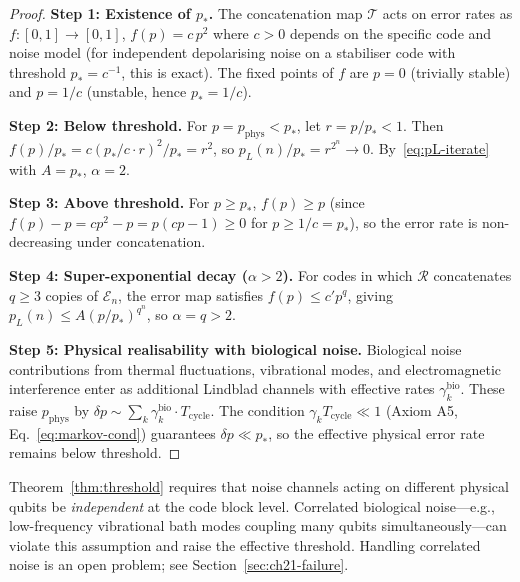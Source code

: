 \begin{proof}
\textbf{Step 1: Existence of $p_*$.}
The concatenation map $\mathcal{T}$ acts on error rates as
$f: [0,1] \to [0,1]$, $f(p) = c\, p^2$ where $c > 0$ depends on
the specific code and noise model (for independent depolarising noise
on a stabiliser code with threshold $p_* = c^{-1}$, this is exact).
The fixed points of $f$ are $p = 0$ (trivially stable) and $p = 1/c$
(unstable, hence $p_* = 1/c$).

\medskip\noindent
\textbf{Step 2: Below threshold.}
For $p = p_{\mathrm{phys}} < p_*$, let $r = p/p_* < 1$.  Then
$f(p)/p_* = c(p_*/c\cdot r)^2 / p_* = r^2$, so $p_L(n)/p_* =
r^{2^n} \to 0$.  By~\eqref{eq:pL-iterate} with $A = p_*$, $\alpha = 2$.

\medskip\noindent
\textbf{Step 3: Above threshold.}
For $p \geq p_*$, $f(p) \geq p$ (since $f(p) - p = c p^2 - p = p(cp -
1) \geq 0$ for $p \geq 1/c = p_*$), so the error rate is non-decreasing
under concatenation.

\medskip\noindent
\textbf{Step 4: Super-exponential decay ($\alpha > 2$).}
For codes in which $\mathcal{R}$ concatenates $q \geq 3$ copies of
$\mathcal{E}_n$, the error map satisfies $f(p) \leq c' p^q$, giving
$p_L(n) \leq A (p/p_*)^{q^n}$, so $\alpha = q > 2$.

\medskip\noindent
\textbf{Step 5: Physical realisability with biological noise.}
Biological noise contributions from thermal fluctuations, vibrational
modes, and electromagnetic interference enter as additional Lindblad
channels with effective rates $\gamma_k^{\mathrm{bio}}$.  These raise
$p_{\mathrm{phys}}$ by
$\delta p \sim \sum_k \gamma_k^{\mathrm{bio}} \cdot T_{\mathrm{cycle}}$.
The condition $\gamma_k T_{\mathrm{cycle}} \ll 1$ (Axiom A5,
Eq.~\eqref{eq:markov-cond}) guarantees $\delta p \ll p_*$, so the
effective physical error rate remains below threshold.
\end{proof}

\begin{remark}
Theorem~\ref{thm:threshold} requires that noise channels acting on
different physical qubits be \emph{independent} at the code block
level.  Correlated biological noise---e.g., low-frequency vibrational
bath modes coupling many qubits simultaneously---can violate this
assumption and raise the effective threshold.  Handling correlated noise
is an open problem; see Section~\ref{sec:ch21-failure}.
\end{remark}

